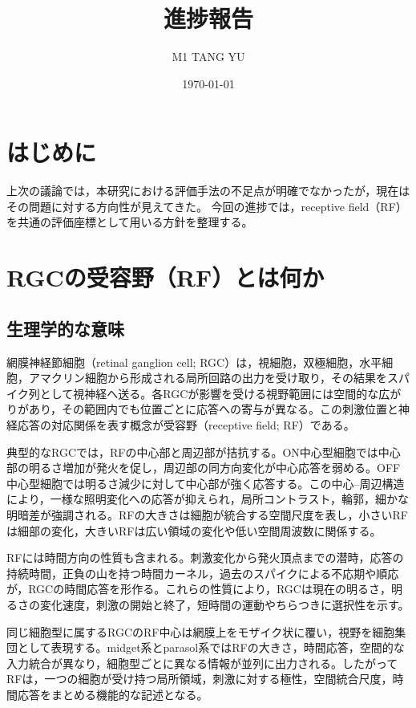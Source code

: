 \documentclass[uplatex,dvipdfmx,a4paper,10pt]{jsarticle}
\title{\textbf{進捗報告}}
\author{M1 TANG YU}
\date{\today}
\begin{document}
\twocolumn[
\maketitle
]

\section{はじめに}
\label{sec:introduction}

上次の議論では，本研究における評価手法の不足点が明確でなかったが，現在はその問題に対する方向性が見えてきた。
今回の進捗では，receptive field（RF）を共通の評価座標として用いる方針を整理する。
\section{RGCの受容野（RF）とは何か}
\label{sec:rf_definition}

\subsection{生理学的な意味}
\label{subsec:rf_physiology}

網膜神経節細胞（retinal ganglion cell; RGC）は，視細胞，双極細胞，水平細胞，アマクリン細胞から形成される局所回路の出力を受け取り，その結果をスパイク列として視神経へ送る。各RGCが影響を受ける視野範囲には空間的な広がりがあり，その範囲内でも位置ごとに応答への寄与が異なる。この刺激位置と神経応答の対応関係を表す概念が受容野（receptive field; RF）である。

典型的なRGCでは，RFの中心部と周辺部が拮抗する。ON中心型細胞では中心部の明るさ増加が発火を促し，周辺部の同方向変化が中心応答を弱める。OFF中心型細胞では明るさ減少に対して中心部が強く応答する。この中心--周辺構造により，一様な照明変化への応答が抑えられ，局所コントラスト，輪郭，細かな明暗差が強調される。RFの大きさは細胞が統合する空間尺度を表し，小さいRFは細部の変化，大きいRFは広い領域の変化や低い空間周波数に関係する。

RFには時間方向の性質も含まれる。刺激変化から発火頂点までの潜時，応答の持続時間，正負の山を持つ時間カーネル，過去のスパイクによる不応期や順応が，RGCの時間応答を形作る。これらの性質により，RGCは現在の明るさ，明るさの変化速度，刺激の開始と終了，短時間の運動やちらつきに選択性を示す。

同じ細胞型に属するRGCのRF中心は網膜上をモザイク状に覆い，視野を細胞集団として表現する。midget系とparasol系ではRFの大きさ，時間応答，空間的な入力統合が異なり，細胞型ごとに異なる情報が並列に出力される。したがってRFは，一つの細胞が受け持つ局所領域，刺激に対する極性，空間統合尺度，時間応答をまとめる機能的な記述となる。
\end{document}
